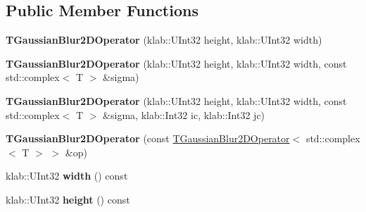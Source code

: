 \subsection*{Public Member Functions}
\begin{DoxyCompactItemize}
\item 
{\bfseries T\+Gaussian\+Blur2\+D\+Operator} (klab\+::\+U\+Int32 height, klab\+::\+U\+Int32 width)\hypertarget{classkl1p_1_1TGaussianBlur2DOperator_3_01std_1_1complex_3_01T_01_4_01_4_a0d117be68a934bb5ee2a3e9604121888}{}\label{classkl1p_1_1TGaussianBlur2DOperator_3_01std_1_1complex_3_01T_01_4_01_4_a0d117be68a934bb5ee2a3e9604121888}

\item 
{\bfseries T\+Gaussian\+Blur2\+D\+Operator} (klab\+::\+U\+Int32 height, klab\+::\+U\+Int32 width, const std\+::complex$<$ T $>$ \&sigma)\hypertarget{classkl1p_1_1TGaussianBlur2DOperator_3_01std_1_1complex_3_01T_01_4_01_4_a95ab38e138ba604ed217aa5a870635ec}{}\label{classkl1p_1_1TGaussianBlur2DOperator_3_01std_1_1complex_3_01T_01_4_01_4_a95ab38e138ba604ed217aa5a870635ec}

\item 
{\bfseries T\+Gaussian\+Blur2\+D\+Operator} (klab\+::\+U\+Int32 height, klab\+::\+U\+Int32 width, const std\+::complex$<$ T $>$ \&sigma, klab\+::\+Int32 ic, klab\+::\+Int32 jc)\hypertarget{classkl1p_1_1TGaussianBlur2DOperator_3_01std_1_1complex_3_01T_01_4_01_4_af4d4f9380d6b3f991031a62729be1795}{}\label{classkl1p_1_1TGaussianBlur2DOperator_3_01std_1_1complex_3_01T_01_4_01_4_af4d4f9380d6b3f991031a62729be1795}

\item 
{\bfseries T\+Gaussian\+Blur2\+D\+Operator} (const \hyperlink{classkl1p_1_1TGaussianBlur2DOperator}{T\+Gaussian\+Blur2\+D\+Operator}$<$ std\+::complex$<$ T $>$ $>$ \&op)\hypertarget{classkl1p_1_1TGaussianBlur2DOperator_3_01std_1_1complex_3_01T_01_4_01_4_a9e74aae2ca4e9ad24c7bb5d8aaf664f3}{}\label{classkl1p_1_1TGaussianBlur2DOperator_3_01std_1_1complex_3_01T_01_4_01_4_a9e74aae2ca4e9ad24c7bb5d8aaf664f3}

\item 
klab\+::\+U\+Int32 {\bfseries width} () const \hypertarget{classkl1p_1_1TGaussianBlur2DOperator_3_01std_1_1complex_3_01T_01_4_01_4_a3d0d32e3a06a8bcf73ff29966d6637a4}{}\label{classkl1p_1_1TGaussianBlur2DOperator_3_01std_1_1complex_3_01T_01_4_01_4_a3d0d32e3a06a8bcf73ff29966d6637a4}

\item 
klab\+::\+U\+Int32 {\bfseries height} () const \hypertarget{classkl1p_1_1TGaussianBlur2DOperator_3_01std_1_1complex_3_01T_01_4_01_4_aa7e9853f4098611cba1643a9cdd98150}{}\label{classkl1p_1_1TGaussianBlur2DOperator_3_01std_1_1complex_3_01T_01_4_01_4_aa7e9853f4098611cba1643a9cdd98150}


\end{DoxyCompactItemize}
